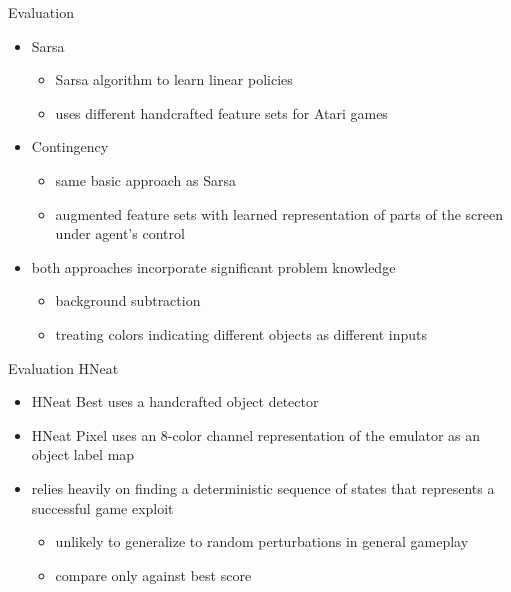 \begin{frame}{Evaluation}
    \begin{itemize}\itemsep=12pt

        \item Sarsa \cite{BNVB:13}
        \vspace*{0.5em}
        \begin{itemize}
            \item Sarsa algorithm to learn linear policies
            \item uses different handcrafted feature sets for Atari games
        \end{itemize}

        \item Contingency \cite{BVB:12}
        \vspace*{0.5em}
        \begin{itemize}
            \item same basic approach as Sarsa
            \item augmented feature sets with learned representation of parts of the screen under agent's control
        \end{itemize}

        \item both approaches incorporate significant problem knowledge
        \vspace*{0.5em}
        \begin{itemize}
            \item background subtraction
            \item treating colors indicating different objects as different inputs
        \end{itemize}

    \end{itemize}
\end{frame}

\begin{frame}{Evaluation}
    HNeat \cite{SKW:13}
    \vspace*{0.5em}
    \begin{itemize}\itemsep=12pt

        \item HNeat Best uses a handcrafted object detector
        
        \item HNeat Pixel uses an 8-color channel representation of the emulator as an object label map

        \item relies heavily on finding a deterministic sequence of states that represents a successful game exploit
        \vspace*{0.5em}
        \begin{itemize}
            \item unlikely to generalize to random perturbations in general gameplay
            \item compare only against best score
        \end{itemize}

    \end{itemize}
\end{frame}

